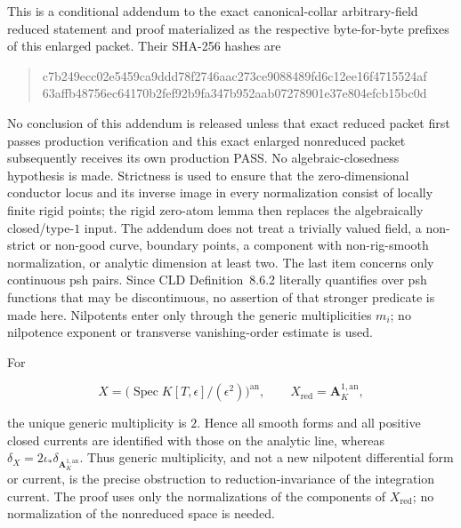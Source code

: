 \begin{remark}
\label{rem:p21p3-gfnr-scope}
This is a conditional addendum to the exact canonical-collar arbitrary-field
reduced statement and proof materialized as the respective byte-for-byte
prefixes of this enlarged packet.  Their SHA-256 hashes are
\begin{quote}
\small\ttfamily
c7b249ecc02e5459ca9ddd78f2746aac273ce9088489fd6c12ee16f4715524af\\
63affb48756ec64170b2fef92b9fa347b952aab07278901e37e804efcb15bc0d
\end{quote}
No conclusion of this addendum is released unless that exact reduced packet
first passes production verification and this exact enlarged nonreduced
packet subsequently receives its own production PASS.  No
algebraic-closedness hypothesis is made.  Strictness is used
to ensure that the zero-dimensional conductor locus and its inverse image
in every normalization consist of locally finite rigid points; the rigid
zero-atom lemma then replaces the algebraically closed/type-\(1\) input.
The addendum does not treat a trivially valued field, a non-strict or
non-good curve, boundary points, a component with non-rig-smooth
normalization, or analytic dimension at least two.  The last item concerns
only continuous psh pairs.  Since CLD Definition~8.6.2 literally
quantifies over psh functions that may be discontinuous, no assertion of
that stronger predicate is made here.  Nilpotents enter only through the
generic multiplicities \(m_i\); no nilpotence exponent or transverse
vanishing-order estimate is used.
\end{remark}

\begin{remark}
\label{rem:p21p3-gfnr-double-line}
For

\[
 X=\bigl(\operatorname{Spec}K[T,\epsilon]/(\epsilon^2)\bigr)^{\mathrm{an}},
 \qquad X_{\mathrm{red}}=\mathbf A_K^{1,\mathrm{an}},
\]

the unique generic multiplicity is \(2\).  Hence all smooth forms and all
positive closed currents are identified with those on the analytic line,
whereas
\(\delta_X=2\iota_*\delta_{\mathbf A_K^{1,\mathrm{an}}}\).
Thus generic multiplicity, and not a new nilpotent differential form or
current, is the precise obstruction to reduction-invariance of the
integration current.  The proof uses only the normalizations of the
components of \(X_{\mathrm{red}}\); no normalization of the nonreduced
space is needed.
\end{remark}
